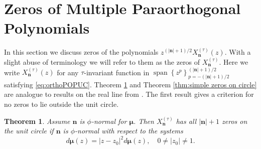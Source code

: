\documentclass[reqno,centertags,11pt,draft]{amsart}
\newtheorem{thm}{Theorem}[section]
\newcommand{\abs}[1]{\left|#1\right|}
\newcommand{\set}[1]{\left\{#1\right\}}
\begin{document}


\section{Zeros of Multiple Paraorthogonal Polynomials}\label{zeros of multiple popuc section}



In this section we discuss zeros of the polynomials $z^{(\abs{\bm{n}}+1)/2}X_{\bm{n}}^{(\tau)}(z)$. With a slight abuse of terminology we will refer to them as the zeros of $X_{\bm{n}}^{(\tau)}$.
Here we write $X_{\bm{n}}^{(\tau)}(z)$ for any $\tau$-invariant function in $\operatorname{span}\set{z^p}_{p = -(\abs{\bm{n}}+1)/2}^{(\abs{\bm{n}}+1)/2}$ satisfying \eqref{eq:orthoPOPUC}. Theorem \ref{thm:zeros outside circle} and Theorem \ref{thm:simple zeros on circle} are analogue to results on the real line from \cite{KVNikInt,KV1}. The first result gives a criterion for no zeros to lie outside the unit circle.

\begin{thm}\label{thm:zeros outside circle}
    Assume $\bm{n}$ is $\phi$-normal for $\bm{\mu}$. Then $X_{\bm{n}}^{(\tau)}$ has all $|\bm{n}|+1$ zeros on the unit circle if $\bm{n}$ is $\phi$-normal with respect to the systems %
    \begin{equation}
        d\widehat{\bm{\mu}}(z) = \abs{z-z_0}^2d\bm{\mu}(z), \quad 0 \neq \abs{z_0} \neq 1.%
    \end{equation}
\end{thm}
\end{document}
